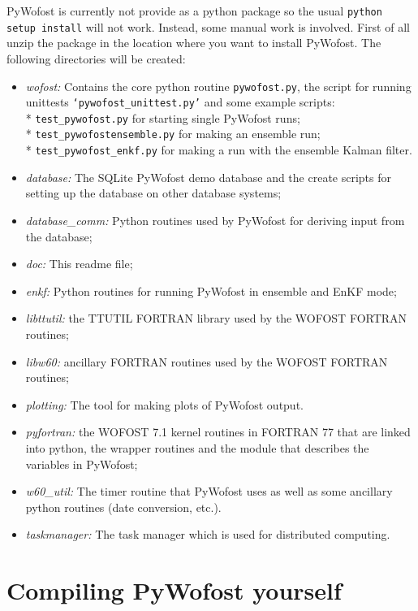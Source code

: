 \documentclass[12pt]{article}
\begin{document}
PyWofost is currently not provide as a python package so the usual \texttt{python setup install}  will not work. Instead, some manual work is involved. First of all unzip the package in the location where you want to install PyWofost. The following directories will be created:
\begin{itemize}
	\item \emph{wofost:} Contains the core python routine \texttt{pywofost.py}, the script for running unittests \texttt{`pywofost\_unittest.py'} and some example scripts:\\* \texttt{test\_pywofost.py} for starting single PyWofost runs;\\* \texttt{test\_pywofostensemble.py} for making an ensemble run;\\* \texttt{test\_pywofost\_enkf.py} for making a run with the ensemble Kalman filter.
	\item \emph{database:} The SQLite PyWofost demo database and the create scripts for setting up the database on other database systems;
	\item \emph{database\_comm:} Python routines used by PyWofost for deriving input from the database;
	\item \emph{doc:} This readme file;
	\item \emph{enkf:} Python routines for running PyWofost in ensemble and EnKF mode;
	\item \emph{libttutil:} the TTUTIL FORTRAN library used by the WOFOST FORTRAN routines;
	\item \emph{libw60:}  ancillary FORTRAN routines used by the WOFOST FORTRAN routines;
	\item \emph{plotting:} The tool for making plots of PyWofost output.
	\item \emph{pyfortran:} the WOFOST 7.1 kernel routines in  FORTRAN 77 that are linked into python, the wrapper routines and the module that describes the variables in PyWofost;
	\item \emph{w60\_util:} The timer routine that PyWofost uses as well as some ancillary python routines (date conversion, etc.).
	\item \emph{taskmanager:} The task manager which is used for distributed computing.
\end{itemize}

\section{Compiling PyWofost yourself}
\end{document}
